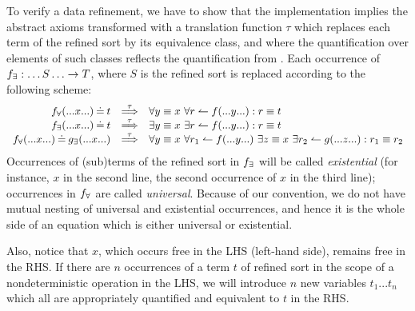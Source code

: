 To verify a data refinement, we have to show that the implementation implies the
abstract
axioms transformed with a translation function $\tau$ which replaces 
each term of the refined sort by its equivalence class, and where the quantification over elements of such classes reflects the quantification from . Each occurrence of $f_\exists:\ldots S\ldots\rightarrow T$, where $S$ is the refined sort is replaced according to the following scheme:
\begin{equation}\label{eq:isverify}
\begin{array}{rcl}
\Bre f(...x...) \Eq t & \TTo{\tau} & \forall y\equiv x\ 
\forall r\isres f(...y...) : r\equiv t\\ \Bree f(...x...) \Eq t & \TTo{\tau} & \exists y\equiv x\ \exists r\isres f(...y...)
: r\equiv t \\
\Bre f(...x...) \Eq \Bree g(...x...) & \TTo{\tau} & \forall y\equiv x\ 
\forall r_1\isres f(...y...)\ \exists z\equiv x\ \exists r_2\isres g(...z...): r_1\equiv r_2 \end{array}
\end{equation}
Occurrences of (sub)terms of the refined sort in $f_\exists$ will be called {\em existential} (for instance, $x$ in the second line, the second occurrence of $x$ in the third line); occurrences in $f_\forall$ are called {\em universal}. Because of our convention, we do not have mutual nesting of universal and existential occurrences, and hence
it is the whole side of an equation which is either universal or existential. 

Also, notice that $x$, which occurs free in the LHS (left-hand side), remains free in the RHS. If there are $n$ occurrences of a term $t$ of refined sort in the scope of a nondeterministic operation in the LHS, we will introduce $n$ new variables $t_1...t_n$ which all are appropriately quantified and equivalent to $t$ in the RHS. 

